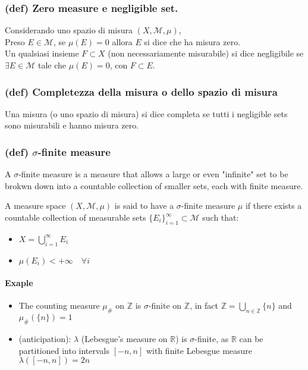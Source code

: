 \subsubsection{(def) Zero measure e negligible set.}
Considerando uno spazio di misura $(X,\mathcal M,\mu)$,\\
Preso $E\in \mathcal M$, se $\mu(E)=0$ allora $E$ si dice che ha misura zero.\\
Un qualsiasi insieme $F\subset X$ (non necessariamente misurabile) si dice negligibile se $\exists E \in \mathcal M$ tale che $\mu(E)=0$, con $F\subset E$.
\subsubsection{(def) Completezza della misura o dello spazio di misura}\label{(def) completezza della misura o dello spazio di misura}
Una misura (o uno spazio di misura) si dice completa se tutti i negligible sets sono misurabili e hanno misura zero.
\subsubsection{(def) $\sigma$-finite measure}
A $\sigma$-finite measure is a measure that allows a large or even "infinite" set to be brokwn down into a countable collection of smaller sets, each with finite measure.

A measure space $(X,\mathcal M,\mu)$ is said to have a $\sigma$-finite measure $\mu$ if there exists a countable collection of measurable sets $\{E_i\}_{i=1}^\infty\subset \mathcal M$ such that:
\begin{itemize}
    \item $X=\bigcup_{i=1}^\infty E_i$
    \item $\mu(E_i)<+\infty \quad \forall i$
\end{itemize}
\paragraph{Exaple}
\begin{itemize}
    \item The counting measure $\mu_\#$ on $\mathbb Z$ is $\sigma$-finite on $\mathbb Z$, in fact $\mathbb Z=\bigcup_{n\in \mathbb Z}\{n\}$ and $\mu_\#(\{n\})=1$
    \item (anticipation): $\lambda$ (Lebesgue's measure on $\mathbb R$) is $\sigma$-finite, as $\mathbb R$ can be partitioned into intervals $[-n,n]$ with finite Lebesgue measure $\lambda([-n,n])=2n$
\end{itemize}